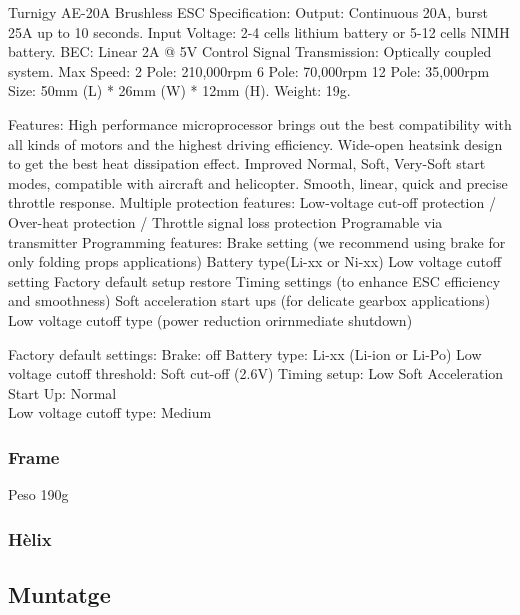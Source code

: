 \documentclass[twoside]{article}
\begin{document}
Turnigy AE-20A Brushless ESC
Specification:
Output:  Continuous 20A, burst 25A up to 10 seconds.
Input Voltage:  2-4 cells lithium battery or 5-12 cells NIMH battery.   
BEC:  Linear 2A @ 5V
Control Signal Transmission: Optically coupled system.
Max Speed:     
   2 Pole: 210,000rpm
   6 Pole: 70,000rpm
   12 Pole: 35,000rpm
Size:  50mm (L) * 26mm (W) * 12mm (H).
Weight:  19g.

Features:
High performance microprocessor brings out the best compatibility with all kinds of motors and the highest driving efficiency.
Wide-open heatsink design to get the best heat dissipation effect.
Improved Normal, Soft, Very-Soft start modes, compatible with aircraft and helicopter. 
Smooth, linear, quick and precise throttle response.
Multiple protection features: Low-voltage cut-off protection / Over-heat protection / Throttle signal loss protection
Programable via transmitter
Programming features:
Brake setting (we recommend using brake for only folding props applications)
Battery type(Li-xx or Ni-xx) 
Low voltage cutoff setting 
Factory default setup restore 
Timing settings (to enhance ESC efficiency and smoothness) 
Soft acceleration start ups (for delicate gearbox applications)
Low voltage cutoff type (power reduction orirnmediate shutdown)
 
Factory default settings:
Brake:  off 
Battery type:  Li-xx (Li-ion or Li-Po) 
Low voltage cutoff threshold:  Soft cut-off (2.6V) 
Timing setup:  Low 
Soft Acceleration Start Up:  Normal \\
Low voltage cutoff type:  Medium


\subsubsection*{Frame}
Peso 190g

\subsubsection*{Hèlix}


\newpage
\subsection{Muntatge}
\end{document}

